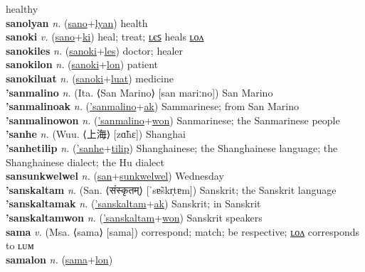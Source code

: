 healthy \label{sanolon} \\
\textbf{sanolyan} \textit{n.} (\hyperref[sano]{sano}+\hyperref[lyan]{lyan})
health \label{sanolyan} \\
\textbf{sanoki} \textit{v.} (\hyperref[sano]{sano}+\hyperref[ki]{ki})
heal; treat; \hyperref[sanokiles]{ʟєꜱ} heals \hyperref[sanokilon]{ʟᴏᴧ} \label{sanoki} \\
\textbf{sanokiles} \textit{n.} (\hyperref[sanoki]{sanoki}+\hyperref[les]{les})
doctor; healer \label{sanokiles} \\
\textbf{sanokilon} \textit{n.} (\hyperref[sanoki]{sanoki}+\hyperref[lon]{lon})
patient \label{sanokilon} \\
\textbf{sanokiluat} \textit{n.} (\hyperref[sanoki]{sanoki}+\hyperref[luat]{luat})
medicine \label{sanokiluat} \\
\textbf{'sanmalino} \textit{n.} (Ita. ⟨San Marino⟩ [san mariːno])
San Marino \label{'sanmalino} \\
\textbf{'sanmalinoak} \textit{n.} (\hyperref['sanmalino]{'sanmalino}+\hyperref[ak]{ak})
Sammarinese; from San Marino \label{'sanmalinoak} \\
\textbf{'sanmalinowon} \textit{n.} (\hyperref['sanmalino]{'sanmalino}+\hyperref[won]{won})
Sanmarinese; the Sanmarinese people \label{'sanmalinowon} \\
\textbf{'sanhe} \textit{n.} (Wuu. ⟨上海⟩ [zɑ̃hɛ])
Shanghai \label{'sanhe} \\
\textbf{'sanhetilip} \textit{n.} (\hyperref['sanhe]{'sanhe}+\hyperref[tilip]{tilip})
Shanghainese; the Shanghainese language; the Shanghainese dialect; the Hu dialect \label{'sanhetilip} \\
\textbf{sansunkwelwel} \textit{n.} (\hyperref[san]{san}+\hyperref[sunkwelwel]{sunkwelwel})
Wednesday \label{sansunkwelwel} \\
\textbf{'sanskaltam} \textit{n.} (San. ⟨संस्कृतम्⟩ [ˈsɐ̃skr̩tɐm])
Sanskrit; the Sanskrit language \label{'sanskaltam} \\
\textbf{'sanskaltamak} \textit{n.} (\hyperref['sanskaltam]{'sanskaltam}+\hyperref[ak]{ak})
Sanskrit; in Sanskrit \label{'sanskaltamak} \\
\textbf{'sanskaltamwon} \textit{n.} (\hyperref['sanskaltam]{'sanskaltam}+\hyperref[won]{won})
Sanskrit speakers \label{'sanskaltamwon} \\
\textbf{sama} \textit{v.} (Msa. ⟨sama⟩ [sama])
correspond; match; be respective; \hyperref[samalon]{ʟᴏᴧ} corresponds to ʟᴜᴍ \label{sama} \\
\textbf{samalon} \textit{n.} (\hyperref[sama]{sama}+\hyperref[lon]{lon})
